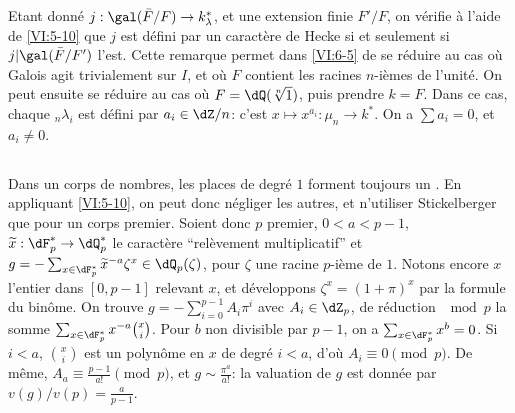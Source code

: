 Etant donné $j:\gal(\bar F/F) \to k_\lambda^\ast$, et une extension finie 
$F'/F$, on vérifie à l'aide de \ref{VI:5-10} que $j$ est défini par un 
caractère de Hecke si et seulement si $j|\gal(\bar F/F')$ l'est. Cette 
remarque permet dans \ref{VI:6-5} de se réduire au cas où Galois agit 
trivialement sur $I$, et où $F$ contient les racines $n$-ièmes de 
l'unité. On peut ensuite se réduire au cas où $F=\dQ(\sqrt[n]{1})$, puis 
prendre $k=F$. Dans ce cas, chaque $_n \lambda_i$ est défini par 
$a_i\in \dZ/n$: c'est $x\mapsto x^{a_i}:\mu_n \to k^\ast$. On a 
$\sum a_i=0$, et $a_i\ne 0$. 





\subsection{}\label{VI:6-7}

Dans un corps de nombres, les places de degré $1$ forment toujours un 
. En appliquant \ref{VI:5-10}, on peut donc négliger 
les autres, et n'utiliser Stickelberger que pour un corps premier. Soient donc 
$p$ premier, $0<a<p-1$, $\widetilde x:\dF_p^\ast \to \dQ_p^\ast$ le 
caractère ``relèvement multiplicatif'' et 
$g=-\sum_{x\in \dF_p^\ast} \widetilde x^{-a} \zeta^x\in \dQ_p(\zeta)$, pour 
$\zeta$ une racine $p$-ième de $1$. Notons encore $x$ l'entier dans $[0,p-1]$ 
relevant $x$, et développons $\zeta^x=(1+\pi)^x$ par la formule du binôme. 
On trouve $g=-\sum_{i=0}^{p-1} A_i\pi^i$ avec $A_i\in \dZ_p$, de réduction 
$\mod p$ la somme $\sum_{x\in \dF_p^\ast} x^{-a} \binom x i$. Pour $b$ non 
divisible par $p-1$, on a $\sum_{x\in \dF_p^\ast} x^b=0$. Si $i<a$, 
$\binom x i$ est un polynôme en $x$ de degré $i<a$, d'où 
$A_i\equiv 0\pmod p$. De même, $A_a\equiv \frac{p-1}{a!} \pmod p$, et 
$g\sim \frac{\pi^a}{a!}$: la valuation de $g$ est donnée par 
$v(g)/v(p) = \frac{a}{p-1}$. 





\subsection{}\label{VI:6-8}

